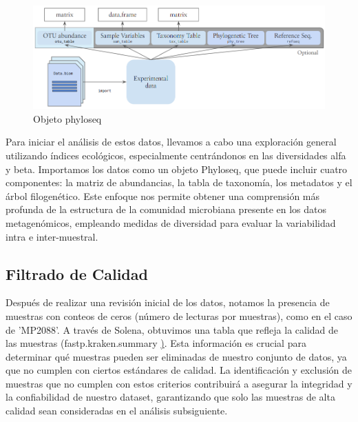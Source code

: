 \begin{figure}[h]
\centering
\includegraphics[width=\textwidth]{Img/cap2/Phyloseq.png}
\caption{Objeto phyloseq }%
\end{figure}

Para iniciar el análisis de estos datos, llevamos a cabo una exploración general utilizando índices ecológicos, especialmente centrándonos en las diversidades alfa y beta. Importamos los datos como un objeto Phyloseq, que puede incluir cuatro componentes: la matriz de abundancias, la tabla de taxonomía, los metadatos y el árbol filogenético. Este enfoque nos permite obtener una comprensión más profunda de la estructura de la comunidad microbiana presente en los datos metagenómicos, empleando medidas de diversidad para evaluar la variabilidad intra e inter-muestral.

\subsection{Filtrado de Calidad}

Después de realizar una revisión inicial de los datos, notamos la presencia de muestras con conteos de ceros (número de lecturas por muestras), como en el caso de 'MP2088'. A través de Solena, obtuvimos una tabla que refleja la calidad de las muestras (fastp.kraken.summary \href{https://github.com/CamilaSilva1995/Tesis_Maestria/blob/main/Analisis_Comparativo/Fresa_Solena/01_Exploracion.pdf}). Esta información es crucial para determinar qué muestras pueden ser eliminadas de nuestro conjunto de datos, ya que no cumplen con ciertos estándares de calidad. La identificación y exclusión de muestras que no cumplen con estos criterios contribuirá a asegurar la integridad y la confiabilidad de nuestro dataset, garantizando que solo las muestras de alta calidad sean consideradas en el análisis subsiguiente.\\

